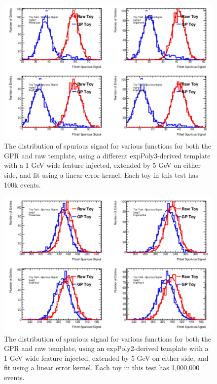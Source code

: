 \begin{figure} 
\begin{center}
  \includegraphics[width=\textwidth]{figures/background/gpr/validation/linear/ToyTest_FitSigVals_highpT_100k_Sig_1s}   
\caption{The distribution of spurious signal for various functions for both the GPR and raw template, using a different expPoly3-derived template with a 1 GeV wide feature injected, extended by 5 GeV on either side, and fit using a linear error kernel. Each toy in this test has 100k events.}
\label{fig:linearkernel_highpt_100k_Sig_1s}
\end{center}
\end{figure}

\begin{figure} 
\begin{center}
  \includegraphics[width=\textwidth]{figures/background/gpr/validation/linear/ToyTest_FitSigVals_lowpT_1M_Sig_1s}   
\caption{The distribution of spurious signal for various functions for both the GPR and raw template, using an expPoly2-derived template with a 1 GeV wide feature injected, extended by 5 GeV on either side, and fit using a linear error kernel. Each toy in this test has 1,000,000 events.}
\label{fig:linearkernel_lowpt_1M_Sig_1s}
\end{center}
\end{figure}

